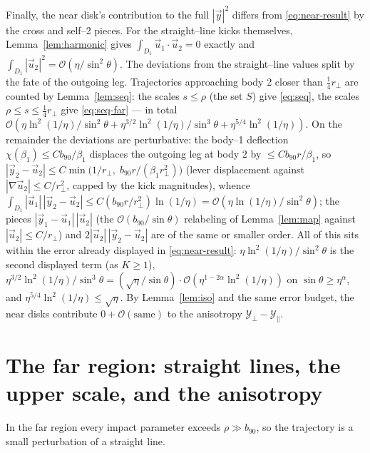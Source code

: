 \documentclass[11pt]{article}
\newcommand{\rp}{r_\perp}
\newcommand{\Yp}{\mathcal Y_\perp}
\newcommand{\Ypa}{\mathcal Y_\parallel}
\newcommand{\bnt}{b_{90}}
\newcommand{\order}[1]{\mathcal O\!\left(#1\right)}
\begin{document}
Finally, the near disk's contribution to the full $|\vec y|^2$ differs from
\eqref{eq:near-result} by the cross and self--2 pieces. For the straight--line kicks themselves,
Lemma~\ref{lem:harmonic} gives $\int_{D_1}\vec u_1\!\cdot\!\vec u_2=0$ exactly and
$\int_{D_1}|\vec u_2|^2=\order{\eta/\sin^2\theta}$. The deviations from the straight--line values
split by the fate of the outgoing leg. Trajectories approaching body 2 closer than $\tfrac14\rp$
are counted by Lemma~\ref{lem:seq}: the scales $s\le\rho$ (the set $S$) give \eqref{eq:seq}, the
scales $\rho\le s\le\tfrac14\rp$ give \eqref{eq:seq-far} --- in total
$\order{\eta\ln^2(1/\eta)/\sin^2\theta+\eta^{3/2}\ln^2(1/\eta)/\sin^3\theta+
\eta^{5/4}\ln^2(1/\eta)}$. On the remainder the deviations are perturbative: the body--1
deflection $\chi(\beta_1)\le Cb_{90}/\beta_1$ displaces the outgoing leg at body 2 by
$\le Cb_{90}r/\beta_1$, so
$|\vec y_2-\vec u_2|\le C\min\!\big(1/\rp,\;b_{90}r/(\beta_1\rp^2)\big)$ (lever displacement
against $|\nabla\vec u_2|\le C/\rp^2$, capped by the kick magnitudes), whence
$\int_{D_1}|\vec u_1|\,|\vec y_2-\vec u_2|\le C(b_{90}r/\rp^2)\ln(1/\eta)
=\order{\eta\ln(1/\eta)/\sin^2\theta}$; the pieces $|\vec y_1-\vec u_1|\,|\vec u_2|$ (the
$\order{\bnt/\sin\theta}$ relabeling of Lemma~\ref{lem:map} against $|\vec u_2|\le C/\rp$) and
$2|\vec u_2|\,|\vec y_2-\vec u_2|$ are of the same or smaller order. All of this sits within the
error already displayed in \eqref{eq:near-result}: $\eta\ln^2(1/\eta)/\sin^2\theta$ is the second
displayed term (as $K\ge1$),
$\eta^{3/2}\ln^2(1/\eta)/\sin^3\theta=(\sqrt\eta/\sin\theta)\cdot\order{\eta^{1-2\alpha}\ln^2(1/\eta)}$
on $\sin\theta\ge\eta^\alpha$, and $\eta^{5/4}\ln^2(1/\eta)\le\sqrt\eta$. By Lemma~\ref{lem:iso} and
the same error budget, the near disks contribute $0+\order{\text{same}}$ to the anisotropy
$\Yp-\Ypa$.

\section{The far region: straight lines, the upper scale, and the anisotropy}
\label{sec:far}

In the far region every impact parameter exceeds $\rho\gg\bnt$, so the trajectory is a small
perturbation of a straight line.
\end{document}
